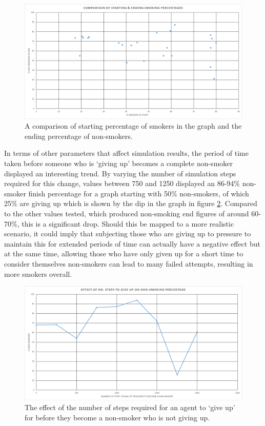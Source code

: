 \documentclass[]{report}
\begin{document}
\begin{figure}
\label{img:smok-pct}
\begin{center}
\includegraphics[width=\textwidth]{smok-pct.png}
\end{center}
\caption{A comparison of starting percentage of smokers in the graph and the ending percentage of non-smokers.}
\end{figure}

In terms of other parameters that affect simulation results, the period of time taken before someone who is `giving up' becomes a complete non-smoker displayed an interesting trend. By varying the number of simulation steps required for this change, values between 750 and 1250 displayed an 86-94\% non-smoker finish percentage for a graph starting with 50\% non-smokers, of which 25\% are giving up which is shown by the dip in the graph in figure \ref{img:give-up}. Compared to the other values tested, which produced non-smoking end figures of around 60-70\%, this is a significant drop. Should this be mapped to a more realistic scenario, it could imply that subjecting those who are giving up to pressure to maintain this for extended periods of time can actually have a negative effect but at the same time, allowing those who have only given up for a short time to consider themselves non-smokers can lead to many failed attempts, resulting in more smokers overall.

\begin{figure}
\label{img:give-up}
\begin{center}
\includegraphics[width=\textwidth]{give-up.png}
\end{center}
\caption{The effect of the number of steps required for an agent to `give up' for before they become a non-smoker who is not giving up.}
\end{figure}
\end{document}
